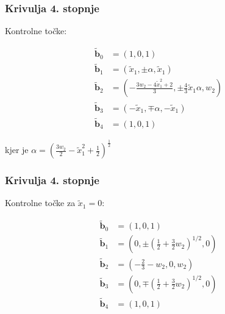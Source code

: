 \documentclass[a4paper, 12pt]{beamer}
\theoremstyle{definition}
\theoremstyle{plain}
\begin{document}
    

\begin{frame}
\frametitle{Krivulja 4. stopnje} 
    Kontrolne točke:
 
        \begin{align*}
            \boldsymbol{\tilde{b}}_0 &= (1,0,1) \\
            \boldsymbol{\tilde{b}}_1 &= (\tilde{x}_1,\pm\alpha,\tilde{x}_1) \\
            \boldsymbol{\tilde{b}}_2 &= (-\frac{3w_2-4\tilde{x}_1^2+2}{3},\pm\frac{4}{3}\tilde{x}_1\alpha,w_2) \\
            \boldsymbol{\tilde{b}}_3 &= (-\tilde{x}_1,\mp\alpha,-\tilde{x}_1) \\
            \boldsymbol{\tilde{b}}_4 &= (1,0,1)
        \end{align*}
    
        kjer je $\alpha=(\frac{3w_2}{2}-\tilde{x}_1^2+\frac{1}{2})^{\frac{1}{2}}$
   
   
\end{frame}


\begin{frame}
\frametitle{Krivulja 4. stopnje}
    Kontrolne točke za $\tilde{x}_1=0$:

        \begin{align*}
            \boldsymbol{\tilde{b}}_0 &= (1,0,1) \\
            \boldsymbol{\tilde{b}}_1 &= (0,\pm (\frac{1}{2}+\frac{3}{2}w_2)^{1/2},0) \\
            \boldsymbol{\tilde{b}}_2 &= (-\frac{2}{3}-w_2,0,w_2) \\
            \boldsymbol{\tilde{b}}_3 &= (0,\mp(\frac{1}{2}+\frac{3}{2}w_2)^{1/2},0) \\
            \boldsymbol{\tilde{b}}_4 &= (1,0,1)
        \end{align*}
  
    
\end{frame}
    
    
\end{document}
